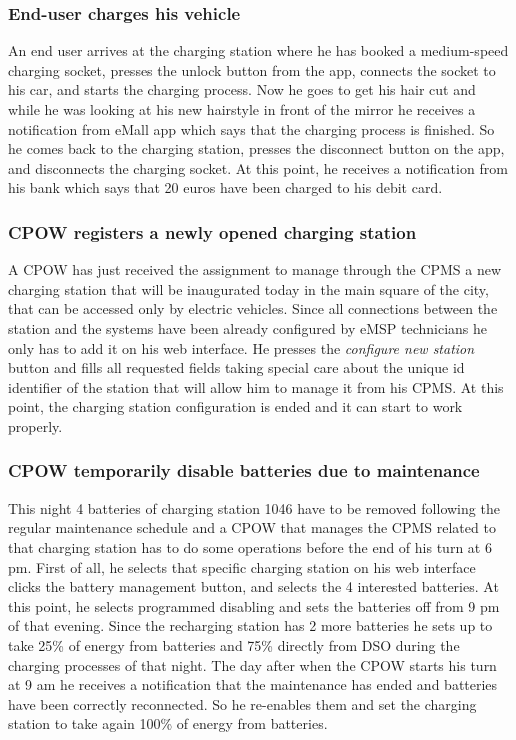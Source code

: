 \documentclass[a4paper]{report}
\begin{document}
\subsubsection{End-user charges his vehicle}
An end user arrives at the charging station where he has booked a medium-speed charging socket, presses the unlock button from the app, connects the socket to his car, and starts the charging process. Now he goes to get his hair cut and while he was looking at his new hairstyle in front of the mirror he receives a notification from eMall app which says that the charging process is finished. So he comes back to the charging station, presses the disconnect button on the app, and disconnects the charging socket. At this point, he receives a notification from his bank which says that 20 euros have been charged to his debit card.

\subsubsection{CPOW registers a newly opened charging station}
A CPOW has just received the assignment to manage through the CPMS a new charging station that will be inaugurated today in the main square of the city, that can be accessed only by electric vehicles. Since all connections between the station and the systems have been already configured by eMSP technicians he only has to add it on his web interface. He presses the \textit{configure new station} button and fills all requested fields taking special care about the unique id identifier of the station that will allow him to manage it from his CPMS. At this point, the charging station configuration is ended and it can start to work properly.

\subsubsection{CPOW temporarily disable batteries due to maintenance}
This night 4 batteries of charging station 1046 have to be removed following the regular maintenance schedule and a CPOW that manages the CPMS related to that charging station has to do some operations before the end of his turn at 6 pm. First of all, he selects that specific charging station on his web interface clicks the battery management button, and selects the 4 interested batteries. At this point, he selects programmed disabling and sets the batteries off from 9 pm of that evening. Since the recharging station has 2 more batteries he sets up to take 25\% of energy from batteries and 75\% directly from DSO during the charging processes of that night. The day after when the CPOW starts his turn at 9 am he receives a notification that the maintenance has ended and batteries have been correctly reconnected. So he re-enables them and set the charging station to take again 100\% of energy from batteries.
\end{document}
